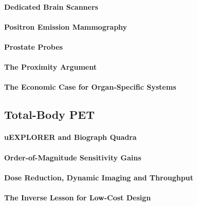 \paragraph{Dedicated Brain Scanners}

\paragraph{Positron Emission Mammography}

\paragraph{Prostate Probes}

\paragraph{The Proximity Argument}

\paragraph{The Economic Case for Organ-Specific Systems}

\subsection{Total-Body PET}

\paragraph{uEXPLORER and Biograph Quadra}

\paragraph{Order-of-Magnitude Sensitivity Gains}

\paragraph{Dose Reduction, Dynamic Imaging and Throughput}

\paragraph{The Inverse Lesson for Low-Cost Design}

